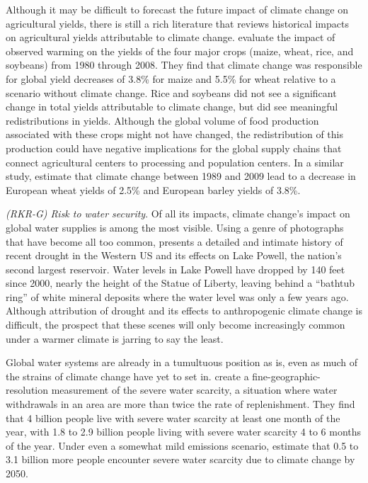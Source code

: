 Although it may be difficult to forecast the future impact of climate change on agricultural yields, there is still a rich literature that reviews historical impacts on agricultural yields attributable to climate change. \cite{lobell2011climate} evaluate the impact of observed warming on the yields of the four major crops (maize, wheat, rice, and soybeans) from 1980 through 2008. They find that climate change was responsible for global yield decreases of 3.8\% for maize and 5.5\% for wheat relative to a scenario without climate change. Rice and soybeans did not see a significant change in total yields attributable to climate change, but did see meaningful redistributions in yields. Although the global volume of food production associated with these crops might not have changed, the redistribution of this production could have negative implications for the global supply chains that connect agricultural centers to processing and population centers. In a similar study, \cite{moore2015fingerprint} estimate that climate change between 1989 and 2009 lead to a decrease in European wheat yields of 2.5\% and European barley yields of 3.8\%.

\textit{(RKR-G) Risk to water security}. Of all its impacts, climate change's impact on global water supplies is among the most visible. Using a genre of photographs that have become all too common, \cite{kolbert2021lost} presents a detailed and intimate history of recent drought in the Western US and its effects on Lake Powell, the nation's second largest reservoir. Water levels in Lake Powell have dropped by 140 feet since 2000, nearly the height of the Statue of Liberty, leaving behind a ``bathtub ring'' of white mineral deposits where the water level was only a few years ago. Although attribution of drought and its effects to anthropogenic climate change is difficult, the prospect that these scenes will only become increasingly common under a warmer climate is jarring to say the least. 

Global water systems are already in a tumultuous position as is, even as much of the strains of climate change have yet to set in. \cite{mekonnen2016four} create a fine-geographic-resolution measurement of the severe water scarcity, a situation where water withdrawals in an area are more than twice the rate of replenishment. They find that 4 billion people live with severe water scarcity at least one month of the year, with 1.8 to 2.9 billion people living with severe water scarcity 4 to 6 months of the year. Under even a somewhat mild emissions scenario, \cite{gosling2016global} estimate that 0.5 to 3.1 billion more people encounter severe water scarcity due to climate change by 2050. 

